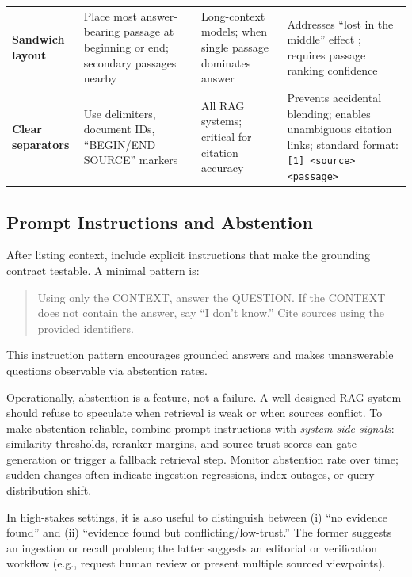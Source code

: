 \begin{table}[tb]
\begin{tabularx}{\linewidth}{@{}>{\raggedright\arraybackslash}p{3cm}>{\raggedright\arraybackslash}X>{\raggedright\arraybackslash}X>{\raggedright\arraybackslash}X@{}}
\addlinespace[1pt]
\textbf{Sandwich layout} & Place most answer-bearing passage at beginning or end; secondary passages nearby & Long-context models; when single passage dominates answer & Addresses ``lost in the middle'' effect \cite{Liu2024LostInTheMiddle}; requires passage ranking confidence \\
\addlinespace[1pt]
\textbf{Clear separators} & Use delimiters, document IDs, ``BEGIN/END SOURCE'' markers & All RAG systems; critical for citation accuracy & Prevents accidental blending; enables unambiguous citation links; standard format: \texttt{[1] <source> <passage>} \\
\bottomrule
\end{tabularx}
\end{table}

\subsection{Prompt Instructions and Abstention}
After listing context, include explicit instructions that make the grounding contract testable. A minimal pattern is:
\begin{quote}\small
Using only the CONTEXT, answer the QUESTION. If the CONTEXT does not contain the answer, say ``I don't know.'' Cite sources using the provided identifiers.
\end{quote}
This instruction pattern encourages grounded answers and makes unanswerable questions observable via abstention rates.

Operationally, abstention is a feature, not a failure. A well-designed RAG system should refuse to speculate when retrieval is weak or when sources conflict. To make abstention reliable, combine prompt instructions with \emph{system-side signals}: similarity thresholds, reranker margins, and source trust scores can gate generation or trigger a fallback retrieval step. Monitor abstention rate over time; sudden changes often indicate ingestion regressions, index outages, or query distribution shift.

In high-stakes settings, it is also useful to distinguish between (i) ``no evidence found'' and (ii) ``evidence found but conflicting/low-trust.'' The former suggests an ingestion or recall problem; the latter suggests an editorial or verification workflow (e.g., request human review or present multiple sourced viewpoints).

